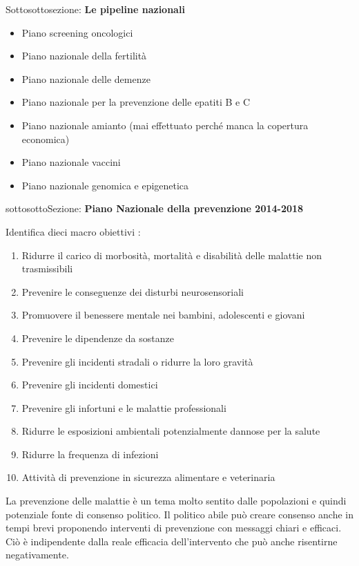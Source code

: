 \documentclass[]{article}
\begin{document}
Sottosottosezione: \textbf{Le pipeline nazionali}

\begin{itemize}
\item
  Piano screening oncologici
\item
  Piano nazionale della fertilità
\item
  Piano nazionale delle demenze
\item
  Piano nazionale per la prevenzione delle epatiti B e C
\item
  Piano nazionale amianto (mai effettuato perché manca la copertura
  economica)
\item
  Piano nazionale vaccini
\item
  Piano nazionale genomica e epigenetica
\end{itemize}

sottosottoSezione: \textbf{Piano Nazionale della prevenzione 2014-2018}

Identifica dieci macro obiettivi :

\begin{enumerate}
\def\labelenumi{\arabic{enumi}.}
\item
  Ridurre il carico di morbosità, mortalità e disabilità delle malattie
  non trasmissibili
\item
  Prevenire le conseguenze dei disturbi neurosensoriali
\item
  Promuovere il benessere mentale nei bambini, adolescenti e giovani
\item
  Prevenire le dipendenze da sostanze
\item
  Prevenire gli incidenti stradali o ridurre la loro gravità
\item
  Prevenire gli incidenti domestici
\item
  Prevenire gli infortuni e le malattie professionali
\item
  Ridurre le esposizioni ambientali potenzialmente dannose per la salute
\item
  Ridurre la frequenza di infezioni
\item
  Attività di prevenzione in sicurezza alimentare e veterinaria
\end{enumerate}

La prevenzione delle malattie è un tema molto sentito dalle popolazioni
e quindi potenziale fonte di consenso politico. Il politico abile può
creare consenso anche in tempi brevi proponendo interventi di
prevenzione con messaggi chiari e efficaci. Ciò è indipendente dalla
reale efficacia dell'intervento che può anche risentirne negativamente.
\end{document}
